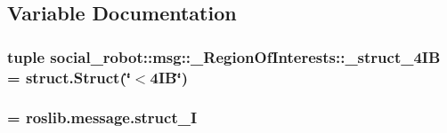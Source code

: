 \subsection{Variable Documentation}
\hypertarget{namespacesocial__robot_1_1msg_1_1__RegionOfInterests_a29a8848fda8944f0f05bda2d5f4e5d9e}{
\subsubsection[{\_\-struct\_\-4IB}]{\setlength{\rightskip}{0pt plus 5cm}tuple {\bf social\_\-robot::msg::\_\-RegionOfInterests::\_\-struct\_\-4IB} = struct.Struct(\char`\"{}$<$4IB\char`\"{})}}
\label{namespacesocial__robot_1_1msg_1_1__RegionOfInterests_a29a8848fda8944f0f05bda2d5f4e5d9e}
\hypertarget{namespacesocial__robot_1_1msg_1_1__RegionOfInterests_a91eac5ebdf4bad3a971f7f52b1e9c46d}{
\subsubsection[{\_\-struct\_\-I}]{ = roslib.message.struct\_\-I}}
\label{namespacesocial__robot_1_1msg_1_1__RegionOfInterests_a91eac5ebdf4bad3a971f7f52b1e9c46d}
